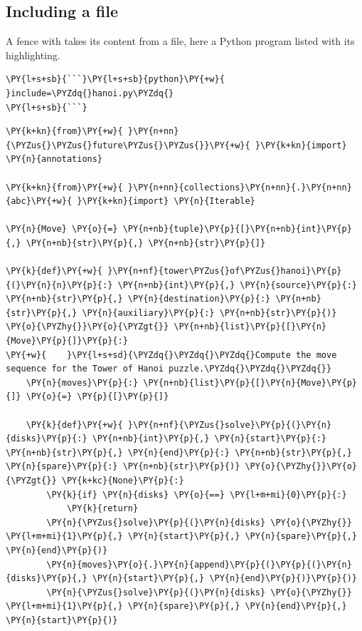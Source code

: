 \documentclass[a4paper,twoside]{article}
\begin{document}
\subsection{Including a file}
A fence with  takes its content from a file, here a Python program listed with its highlighting.
\begin{tscode}[lang=md, engine=pygments]
\begin{Verbatim}[commandchars=\\\{\},breaklines, breakanywhere, commandchars=\\\{\}]
\PY{l+s+sb}{```}\PY{l+s+sb}{python}\PY{+w}{ }include=\PYZdq{}hanoi.py\PYZdq{}
\PY{l+s+sb}{```}
\end{Verbatim}
\end{tscode}
\begin{tscode}[lang=python, engine=pygments]
\begin{Verbatim}[commandchars=\\\{\},breaklines, breakanywhere, commandchars=\\\{\}]
\PY{k+kn}{from}\PY{+w}{ }\PY{n+nn}{\PYZus{}\PYZus{}future\PYZus{}\PYZus{}}\PY{+w}{ }\PY{k+kn}{import} \PY{n}{annotations}

\PY{k+kn}{from}\PY{+w}{ }\PY{n+nn}{collections}\PY{n+nn}{.}\PY{n+nn}{abc}\PY{+w}{ }\PY{k+kn}{import} \PY{n}{Iterable}

\PY{n}{Move} \PY{o}{=} \PY{n+nb}{tuple}\PY{p}{[}\PY{n+nb}{int}\PY{p}{,} \PY{n+nb}{str}\PY{p}{,} \PY{n+nb}{str}\PY{p}{]}

\PY{k}{def}\PY{+w}{ }\PY{n+nf}{tower\PYZus{}of\PYZus{}hanoi}\PY{p}{(}\PY{n}{n}\PY{p}{:} \PY{n+nb}{int}\PY{p}{,} \PY{n}{source}\PY{p}{:} \PY{n+nb}{str}\PY{p}{,} \PY{n}{destination}\PY{p}{:} \PY{n+nb}{str}\PY{p}{,} \PY{n}{auxiliary}\PY{p}{:} \PY{n+nb}{str}\PY{p}{)} \PY{o}{\PYZhy{}}\PY{o}{\PYZgt{}} \PY{n+nb}{list}\PY{p}{[}\PY{n}{Move}\PY{p}{]}\PY{p}{:}
\PY{+w}{    }\PY{l+s+sd}{\PYZdq{}\PYZdq{}\PYZdq{}Compute the move sequence for the Tower of Hanoi puzzle.\PYZdq{}\PYZdq{}\PYZdq{}}
    \PY{n}{moves}\PY{p}{:} \PY{n+nb}{list}\PY{p}{[}\PY{n}{Move}\PY{p}{]} \PY{o}{=} \PY{p}{[}\PY{p}{]}

    \PY{k}{def}\PY{+w}{ }\PY{n+nf}{\PYZus{}solve}\PY{p}{(}\PY{n}{disks}\PY{p}{:} \PY{n+nb}{int}\PY{p}{,} \PY{n}{start}\PY{p}{:} \PY{n+nb}{str}\PY{p}{,} \PY{n}{end}\PY{p}{:} \PY{n+nb}{str}\PY{p}{,} \PY{n}{spare}\PY{p}{:} \PY{n+nb}{str}\PY{p}{)} \PY{o}{\PYZhy{}}\PY{o}{\PYZgt{}} \PY{k+kc}{None}\PY{p}{:}
        \PY{k}{if} \PY{n}{disks} \PY{o}{==} \PY{l+m+mi}{0}\PY{p}{:}
            \PY{k}{return}
        \PY{n}{\PYZus{}solve}\PY{p}{(}\PY{n}{disks} \PY{o}{\PYZhy{}} \PY{l+m+mi}{1}\PY{p}{,} \PY{n}{start}\PY{p}{,} \PY{n}{spare}\PY{p}{,} \PY{n}{end}\PY{p}{)}
        \PY{n}{moves}\PY{o}{.}\PY{n}{append}\PY{p}{(}\PY{p}{(}\PY{n}{disks}\PY{p}{,} \PY{n}{start}\PY{p}{,} \PY{n}{end}\PY{p}{)}\PY{p}{)}
        \PY{n}{\PYZus{}solve}\PY{p}{(}\PY{n}{disks} \PY{o}{\PYZhy{}} \PY{l+m+mi}{1}\PY{p}{,} \PY{n}{spare}\PY{p}{,} \PY{n}{end}\PY{p}{,} \PY{n}{start}\PY{p}{)}


\end{Verbatim}
\end{tscode}
\end{document}
